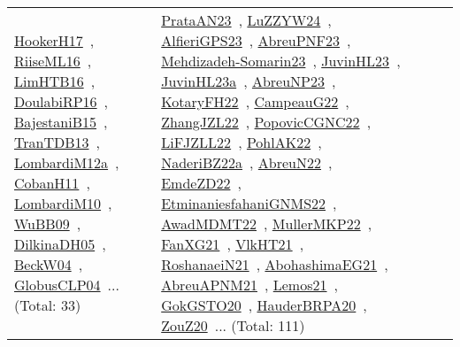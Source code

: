 {\begin{longtable}{lp{3cm}>{\raggedright\arraybackslash}p{6cm}>{\raggedright\arraybackslash}p{6cm}>{\raggedright\arraybackslash}p{8cm}}
\href{../works/HookerH17.pdf}{HookerH17}~\cite{HookerH17}, \href{../works/RiiseML16.pdf}{RiiseML16}~\cite{RiiseML16}, \href{../works/LimHTB16.pdf}{LimHTB16}~\cite{LimHTB16}, \href{../works/DoulabiRP16.pdf}{DoulabiRP16}~\cite{DoulabiRP16}, \href{../works/BajestaniB15.pdf}{BajestaniB15}~\cite{BajestaniB15}, \href{../works/TranTDB13.pdf}{TranTDB13}~\cite{TranTDB13}, \href{../works/LombardiM12a.pdf}{LombardiM12a}~\cite{LombardiM12a}, \href{../works/CobanH11.pdf}{CobanH11}~\cite{CobanH11}, \href{../works/LombardiM10.pdf}{LombardiM10}~\cite{LombardiM10}, \href{../works/WuBB09.pdf}{WuBB09}~\cite{WuBB09}, \href{../works/DilkinaDH05.pdf}{DilkinaDH05}~\cite{DilkinaDH05}, \href{../works/BeckW04.pdf}{BeckW04}~\cite{BeckW04}, \href{../works/GlobusCLP04.pdf}{GlobusCLP04}~\cite{GlobusCLP04}... (Total: 33) & \href{../works/PrataAN23.pdf}{PrataAN23}~\cite{PrataAN23}, \href{../works/LuZZYW24.pdf}{LuZZYW24}~\cite{LuZZYW24}, \href{../works/AlfieriGPS23.pdf}{AlfieriGPS23}~\cite{AlfieriGPS23}, \href{../works/AbreuPNF23.pdf}{AbreuPNF23}~\cite{AbreuPNF23}, \href{../works/Mehdizadeh-Somarin23.pdf}{Mehdizadeh-Somarin23}~\cite{Mehdizadeh-Somarin23}, \href{../works/JuvinHL23.pdf}{JuvinHL23}~\cite{JuvinHL23}, \href{../works/JuvinHL23a.pdf}{JuvinHL23a}~\cite{JuvinHL23a}, \href{../works/AbreuNP23.pdf}{AbreuNP23}~\cite{AbreuNP23}, \href{../works/KotaryFH22.pdf}{KotaryFH22}~\cite{KotaryFH22}, \href{../works/CampeauG22.pdf}{CampeauG22}~\cite{CampeauG22}, \href{../works/ZhangJZL22.pdf}{ZhangJZL22}~\cite{ZhangJZL22}, \href{../works/PopovicCGNC22.pdf}{PopovicCGNC22}~\cite{PopovicCGNC22}, \href{../works/LiFJZLL22.pdf}{LiFJZLL22}~\cite{LiFJZLL22}, \href{../works/PohlAK22.pdf}{PohlAK22}~\cite{PohlAK22}, \href{../works/NaderiBZ22a.pdf}{NaderiBZ22a}~\cite{NaderiBZ22a}, \href{../works/AbreuN22.pdf}{AbreuN22}~\cite{AbreuN22}, \href{../works/EmdeZD22.pdf}{EmdeZD22}~\cite{EmdeZD22}, \href{../works/EtminaniesfahaniGNMS22.pdf}{EtminaniesfahaniGNMS22}~\cite{EtminaniesfahaniGNMS22}, \href{../works/AwadMDMT22.pdf}{AwadMDMT22}~\cite{AwadMDMT22}, \href{../works/MullerMKP22.pdf}{MullerMKP22}~\cite{MullerMKP22}, \href{../works/FanXG21.pdf}{FanXG21}~\cite{FanXG21}, \href{../works/VlkHT21.pdf}{VlkHT21}~\cite{VlkHT21}, \href{../works/RoshanaeiN21.pdf}{RoshanaeiN21}~\cite{RoshanaeiN21}, \href{../works/AbohashimaEG21.pdf}{AbohashimaEG21}~\cite{AbohashimaEG21}, \href{../works/AbreuAPNM21.pdf}{AbreuAPNM21}~\cite{AbreuAPNM21}, \href{../works/Lemos21.pdf}{Lemos21}~\cite{Lemos21}, \href{../works/GokGSTO20.pdf}{GokGSTO20}~\cite{GokGSTO20}, \href{../works/HauderBRPA20.pdf}{HauderBRPA20}~\cite{HauderBRPA20}, \href{../works/ZouZ20.pdf}{ZouZ20}~\cite{ZouZ20}... (Total: 111)\\

\end{longtable}}
